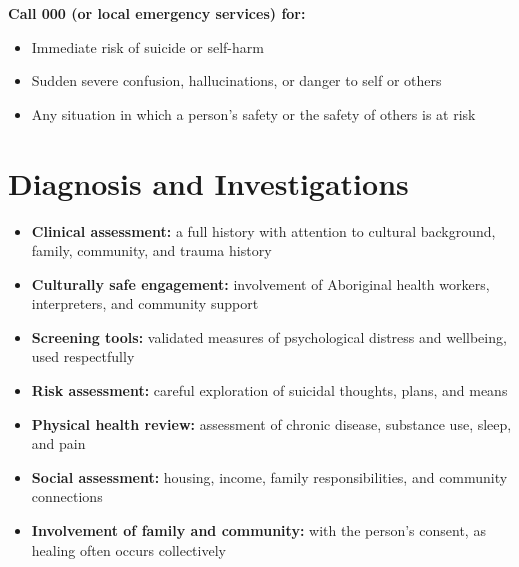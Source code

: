 \textbf{Call 000 (or local emergency services) for:}
\begin{itemize}
    \item Immediate risk of suicide or self-harm
    \item Sudden severe confusion, hallucinations, or danger to self or others
    \item Any situation in which a person's safety or the safety of others is at risk
\end{itemize}

\section*{Diagnosis and Investigations}
\begin{itemize}
    \item \textbf{Clinical assessment:} a full history with attention to cultural background, family, community, and trauma history
    \item \textbf{Culturally safe engagement:} involvement of Aboriginal health workers, interpreters, and community support
    \item \textbf{Screening tools:} validated measures of psychological distress and wellbeing, used respectfully
    \item \textbf{Risk assessment:} careful exploration of suicidal thoughts, plans, and means
    \item \textbf{Physical health review:} assessment of chronic disease, substance use, sleep, and pain
    \item \textbf{Social assessment:} housing, income, family responsibilities, and community connections
    \item \textbf{Involvement of family and community:} with the person's consent, as healing often occurs collectively
\end{itemize}

